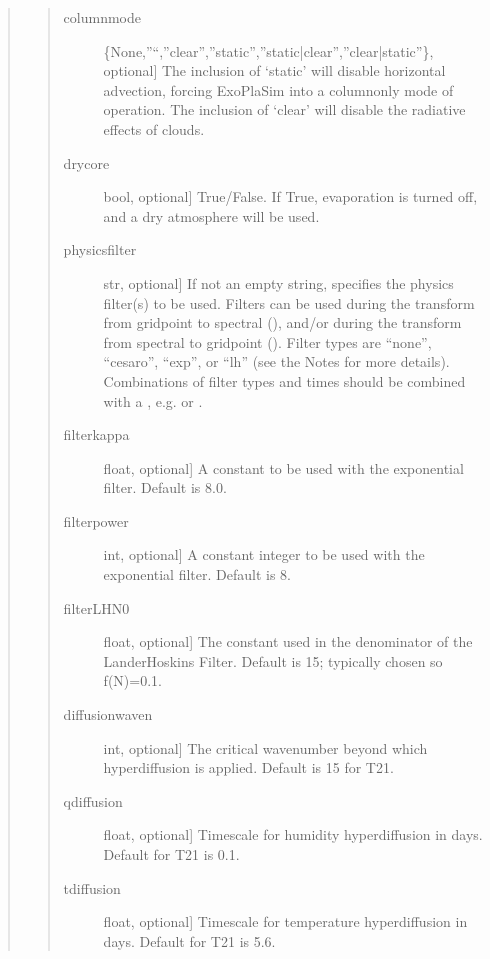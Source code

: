 \documentclass[letterpaper,10pt,english]{sphinxmanual}
\begin{document}
\begin{fulllineitems}
\begin{fulllineitems}
\begin{quote}
\begin{quote}
\begin{description}
\item[{columnmode}] \leavevmode{[}\{None,”\sphinxhyphen{}“,”clear”,”static”,”static|clear”,”clear|static”\}, optional{]}
The inclusion of ‘static’ will disable horizontal advection, forcing ExoPlaSim
into a column\sphinxhyphen{}only mode of operation. The inclusion of ‘clear’ will disable
the radiative effects of clouds.

\item[{drycore}] \leavevmode{[}bool, optional{]}
True/False. If True, evaporation is turned off, and a dry atmosphere will
be used.

\item[{physicsfilter}] \leavevmode{[}str, optional{]}
If not an empty string, specifies the physics filter(s) to be used. Filters
can be used during the transform from gridpoint to spectral (), and/or
during the transform from spectral to gridpoint (). Filter types are
“none”, “cesaro”, “exp”, or “lh” (see the Notes for more details).
Combinations of filter types and times should be combined with a \sphinxcode{\sphinxupquote{|}},
e.g.  or .

\item[{filterkappa}] \leavevmode{[}float, optional{]}
A constant to be used with the exponential filter. Default is 8.0.

\item[{filterpower}] \leavevmode{[}int, optional{]}
A constant integer to be used with the exponential filter. Default is 8.

\item[{filterLHN0}] \leavevmode{[}float, optional{]}
The constant used in the denominator of the Lander\sphinxhyphen{}Hoskins Filter. Default
is 15; typically chosen so f(N)=0.1.

\item[{diffusionwaven}] \leavevmode{[}int, optional{]}
The critical wavenumber beyond which hyperdiffusion is applied. Default
is 15 for T21.

\item[{qdiffusion}] \leavevmode{[}float, optional{]}
Timescale for humidity hyperdiffusion in days. Default for T21 is 0.1.

\item[{tdiffusion}] \leavevmode{[}float, optional{]}
Timescale for temperature hyperdiffusion in days. Default for T21 is 5.6.


\end{description}
\end{quote}
\end{quote}
\end{fulllineitems}
\end{fulllineitems}
\end{document}
